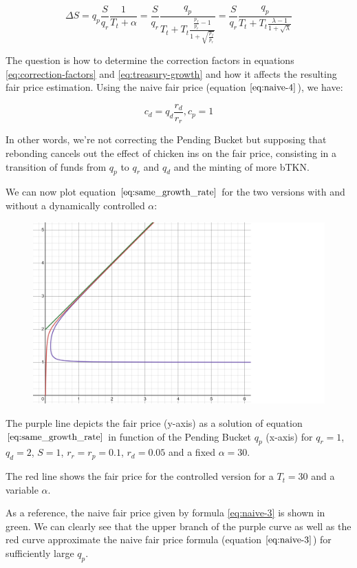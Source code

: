 \documentclass{article}
\begin{document}
\begin{equation}
  \label{}
  \Delta S = q_p \frac{S}{q_r} \frac{1}{T_t+\alpha}
  =  \frac{S}{q_r} \frac{q_p}{T_t+ T_t\frac{\frac{p_f}{p_r} - 1}{1 + \sqrt{\frac{p_f}{p_r}}}}  
  =  \frac{S}{q_r} \frac{q_p}{T_t+ T_t\frac{\lambda - 1}{1 + \sqrt{\lambda}}}  
\end{equation}


The question is how to determine the correction factors in equations \ref{eq:correction-factors} and \ref{eq:treasury-growth} and how it affects the resulting fair price estimation. Using the naive fair price (equation $\ref{eq:naive-4}$), we have:

\begin{equation}
  \label{}
   c_d=q_d \frac{r_d}{r_r}, c_p=1
\end{equation}

In other words, we're not correcting the Pending Bucket but supposing that rebonding cancels out the effect of chicken ins on the fair price, consisting in a transition of funds from $q_p$ to $q_r$ and $q_d$ and the minting of more bTKN.

\pagebreak

We can now plot equation $\ref{eq:same_growth_rate}$ for the two versions with and without a dynamically controlled $\alpha$:

\begin{figure}[h]
    \centering
    \includegraphics[width=0.5\linewidth]{./ChickenBonds_Whitepaper_growth_price.png}
\end{figure}

The purple line depicts the fair price (y-axis) as a solution of equation $\ref{eq:same_growth_rate}$ in function of the Pending Bucket $q_p$ (x-axis) for $q_r=1$, $q_d=2$, $S=1$, $r_r=r_p=0.1$, $r_d=0.05$ and a fixed $\alpha=30$. 

The red line shows the fair price for the controlled version for a $T_t=30$ and a variable $\alpha$.

As a reference, the naive fair price given by formula \ref{eq:naive-3} is shown in green. We can clearly see that the upper branch of the purple curve as well as the red curve approximate the naive fair price formula (equation $\ref{eq:naive-3}$) for sufficiently large $q_p$. 
\end{document}
